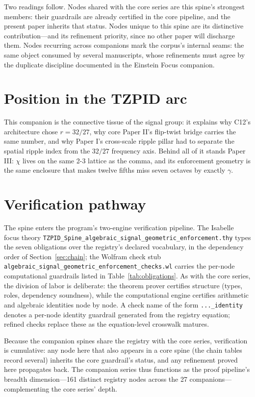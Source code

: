 \documentclass[11pt]{article}
\theoremstyle{remark}
\begin{document}
Two readings follow. Nodes shared with the core series are this spine's strongest members: their guardrails are already certified in the core pipeline, and the present paper inherits that status. Nodes unique to this spine are its distinctive contribution---and its refinement priority, since no other paper will discharge them. Nodes recurring across companions mark the corpus's internal seams: the same object consumed by several manuscripts, whose refinements must agree by the duplicate discipline documented in the Einstein Focus companion.

\section{Position in the TZPID arc}
\label{sec:arc}

This companion is the connective tissue of the signal group: it explains why C12's architecture chose $r = 32/27$, why core Paper II's flip-twist bridge carries the same number, and why Paper I's cross-scale ripple pillar had to separate the spatial ripple index from the $32/27$ frequency axis. Behind all of it stands Paper III: $\chi$ lives on the same 2-3 lattice as the comma, and its enforcement geometry is the same enclosure that makes twelve fifths miss seven octaves by exactly $\gamma$.

\section{Verification pathway}
\label{sec:verify}

The spine enters the program's two-engine verification pipeline. The Isabelle focus theory \texttt{TZPID\_Spine\_algebraic\_signal\_geometric\_enforcement.thy} types the seven obligations over the registry's declared vocabulary, in the dependency order of Section~\ref{sec:chain}; the Wolfram check stub \texttt{algebraic\_signal\_geometric\_enforcement\_checks.wl} carries the per-node computational guardrails listed in Table~\ref{tab:obligations}. As with the core series, the division of labor is deliberate: the theorem prover certifies structure (types, roles, dependency soundness), while the computational engine certifies arithmetic and algebraic identities node by node. A check name of the form \texttt{...\_identity} denotes a per-node identity guardrail generated from the registry equation; refined checks replace these as the equation-level crosswalk matures.

Because the companion spines share the registry with the core series, verification is cumulative: any node here that also appears in a core spine (the chain tables record several) inherits the core guardrail's status, and any refinement proved here propagates back. The companion series thus functions as the proof pipeline's breadth dimension---161 distinct registry nodes across the 27 companions---complementing the core series' depth.
\end{document}
